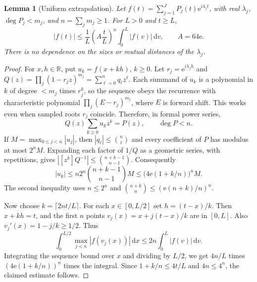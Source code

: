 \documentclass[11pt]{article}
\newtheorem{lemma}[theorem]{Lemma}
\theoremstyle{remark}\newtheorem{remark}[theorem]{Remark}
\newcommand{\R}{\mathbb R}
\newcommand{\e}{\mathrm e}
\newcommand{\dd}{\,\mathrm d}
\begin{document}
\begin{lemma}[Uniform extrapolation]\label{lem:extra}
Let $f(t)=\sum_{j=1}^J P_j(t)\e^{i\lambda_j t}$, with real $\lambda_j$, $\deg P_j<m_j$, and $n=\sum_jm_j\ge1$. For $L>0$ and $t\ge L$,
\[
 |f(t)|\le \frac{1}{L}\left(A\frac{t}{L}\right)^n\int_0^L |f(v)|\dd v,\qquad A=64\e.
\]
There is no dependence on the sizes or mutual distances of the $\lambda_j$.
\end{lemma}
\begin{proof}
For $x,h\in\R$, put $u_k=f(x+kh)$, $k\ge0$. Let $r_j=\e^{i\lambda_jh}$ and $Q(z)=\prod_j(1-r_j z)^{m_j}=\sum_{\ell=0}^n q_\ell z^\ell$. Each summand of $u_k$ is a polynomial in $k$ of degree $<m_j$ times $r_j^k$, so the sequence obeys the recurrence with characteristic polynomial $\prod_j(E-r_j)^{m_j}$, where $E$ is forward shift. This works even when sampled roots $r_j$ coincide. Therefore, in formal power series,
\[
 Q(z)\sum_{k\ge0}u_kz^k=P(z),\qquad \deg P<n.
\]
If $M=\max_{0\le j<n}|u_j|$, then $|q_\ell|\le\binom n\ell$ and every coefficient of $P$ has modulus at most $2^n M$. Expanding each factor of $1/Q$ as a geometric series, with repetitions, gives $|[z^k]Q^{-1}|\le\binom{n+k-1}{n-1}$. Consequently
\[
 |u_k|\le n2^n\binom{n+k-1}{n-1}M
 \le \bigl(4\e(1+k/n)\bigr)^n M.
\]
The second inequality uses $n\le2^n$ and $\binom{n+k}n\le(\e(n+k)/n)^n$.

Now choose $k=\lceil2nt/L\rceil$. For each $x\in[0,L/2]$ set $h=(t-x)/k$. Then $x+kh=t$, and the first $n$ points $v_j(x)=x+j(t-x)/k$ are in $[0,L]$. Also $v_j'(x)=1-j/k\ge1/2$. Thus
\[
 \int_0^{L/2}\max_{j<n}|f(v_j(x))|\dd x
 \le 2n\int_0^L |f(v)|\dd v.
\]
Integrating the sequence bound over $x$ and dividing by $L/2$, we get $4n/L$ times $(4\e(1+k/n))^n$ times the integral. Since $1+k/n\le4t/L$ and $4n\le4^n$, the claimed estimate follows.
\end{proof}
\end{document}
